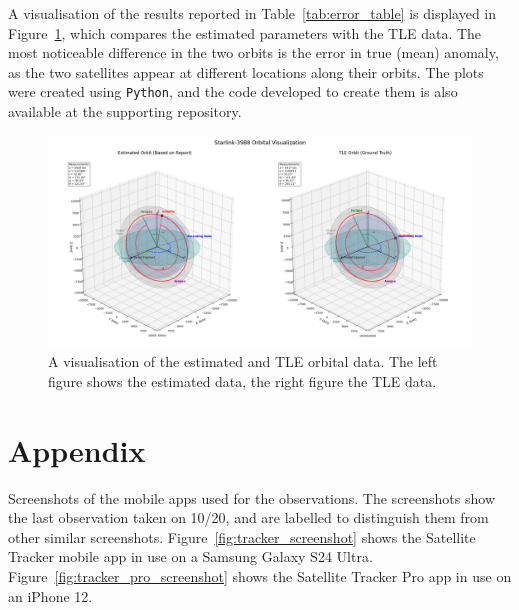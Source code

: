 \documentclass{article}
\begin{document}
A visualisation of the results reported in Table~\ref{tab:error_table} is displayed in Figure~\ref{fig:data_visualisation}, which compares the estimated parameters with the TLE data. The most noticeable difference in the two orbits is the error in true (mean) anomaly, as the two satellites appear at different locations along their orbits. The plots were created using \texttt{Python}, and the code developed to create them is also available at the supporting repository.

\begin{figure}
    \centering
    \includegraphics[width=\linewidth]{LaTeX/Figures/Orbital_Plots.png}
    \caption{A visualisation of the estimated and TLE orbital data. The left figure shows the estimated data, the right figure the TLE data.}
    \label{fig:data_visualisation}
\end{figure}

\printbibliography

\newpage
\appendix
\section{Appendix} \label{Appendix}

Screenshots of the mobile apps used for the observations. The screenshots show the last observation taken on 10/20, and are labelled to distinguish them from other similar screenshots. Figure~\ref{fig:tracker_screenshot} shows the Satellite Tracker mobile app in use on a Samsung Galaxy S24 Ultra. Figure~\ref{fig:tracker_pro_screenshot} shows the Satellite Tracker Pro app in use on an iPhone 12.
\end{document}

